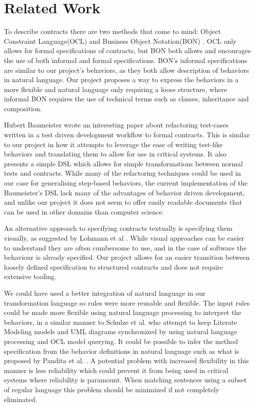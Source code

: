 \section{Related Work}
\label{sec:RelatedWork}
To describe contracts there are two methods that come to mind: Object Constraint Language(OCL) \cite{omg2010} and Business Object Notation(BON) \cite{walden1995}.
OCL only allows for formal specifications of contracts, but BON both allows and encourages the use of both informal and formal specifications.
BON's informal specifications are similar to our project's behaviors, as they both allow description of behaviors in natural language.
Our project proposes a way to express the behaviors in a more flexible and natural language only requiring a loose structure, where informal BON requires the use of technical terms such as classes, inheritance and composition.

Hubert Baumeister wrote an interesting paper \cite{baumeister2004} about refactoring test-cases written in a test driven development workflow to formal contracts.
This is similar to our project in how it attempts to leverage the ease of writing test-like behaviors and translating them to allow for use in critical systems.
It also presents a simple DSL which allows for simple transformations between normal tests and contracts.
While many of the refactoring techniques could be used in our case for generalising step-based behaviors, the current implementation of the Baumeister’s DSL lack many of the advantages of behavior driven development, and unlike our project it does not seem to offer easily readable documents that can be used in other domains than computer science.

An alternative approach to specifying contracts textually is specifying them visually, as suggested by Lohmann et al \cite{lohmann2006}. While visual approaches can be easier to understand they are often cumbersome to use, and in the case of software the behaviour is already specified.
Our project allows for an easier transition between loosely defined specification to structured contracts and does not require extensive tooling.

We could have used a better integration of natural language in our transformation language so rules were more reusable and flexible. 
The input rules could be made more flexible using natural language processing to interpret the behaviors, in a similar manner to Schulze et al. \cite{schulze2012} who attempt to keep Literate Modeling models and UML diagrams synchronized by using natural language processing and OCL model querying.
It could be possible to infer the method specification from the behavior definitions in natural language such as what is proposed by Pandita et al. \cite{pandita2012}.
A potential problem with increased flexibility in this manner is less reliability which could prevent it from being used in critical systems where reliability is paramount.
When matching sentences using a subset of regular language this problem should be minimized if not completely eliminated.
